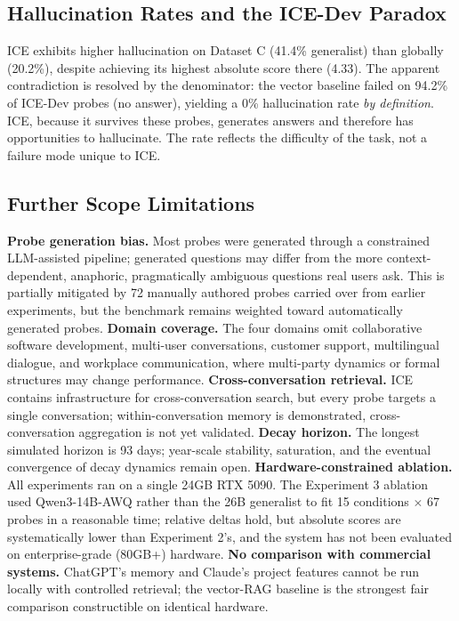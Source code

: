 \documentclass[10pt]{article}
\begin{document}
\subsection{Hallucination Rates and the ICE-Dev Paradox}
ICE exhibits higher hallucination on Dataset C (41.4\% generalist) than globally (20.2\%), despite achieving its highest absolute score there (4.33). The apparent contradiction is resolved by the denominator: the vector baseline failed on 94.2\% of ICE-Dev probes (no answer), yielding a 0\% hallucination rate \emph{by definition}. ICE, because it survives these probes, generates answers and therefore has opportunities to hallucinate. The rate reflects the difficulty of the task, not a failure mode unique to ICE.

\subsection{Further Scope Limitations}
\textbf{Probe generation bias.} Most probes were generated through a constrained LLM-assisted pipeline; generated questions may differ from the more context-dependent, anaphoric, pragmatically ambiguous questions real users ask. This is partially mitigated by 72 manually authored probes carried over from earlier experiments, but the benchmark remains weighted toward automatically generated probes. \textbf{Domain coverage.} The four domains omit collaborative software development, multi-user conversations, customer support, multilingual dialogue, and workplace communication, where multi-party dynamics or formal structures may change performance. \textbf{Cross-conversation retrieval.} ICE contains infrastructure for cross-conversation search, but every probe targets a single conversation; within-conversation memory is demonstrated, cross-conversation aggregation is not yet validated. \textbf{Decay horizon.} The longest simulated horizon is 93 days; year-scale stability, saturation, and the eventual convergence of decay dynamics remain open. \textbf{Hardware-constrained ablation.} All experiments ran on a single 24GB RTX 5090. The Experiment 3 ablation used Qwen3-14B-AWQ rather than the 26B generalist to fit 15 conditions $\times$ 67 probes in a reasonable time; relative deltas hold, but absolute scores are systematically lower than Experiment 2's, and the system has not been evaluated on enterprise-grade (80GB+) hardware. \textbf{No comparison with commercial systems.} ChatGPT's memory and Claude's project features cannot be run locally with controlled retrieval; the vector-RAG baseline is the strongest fair comparison constructible on identical hardware.
\end{document}
